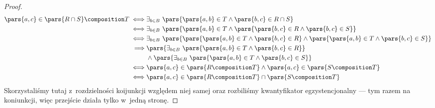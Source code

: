 \begin{description}
\begin{itemize}
                \begin{proof}
                    \begin{equation*}
                        \begin{split}
                            \pars{a, c} \in \pars{R \cap S} \composition T
                                \iff& \exists_{b \in B} \ \pars{\pars{a, b} \in T \land \pars{b, c} \in R \cap S}\\
                                \iff& \exists_{b \in B} \ \pars{\pars{a, b} \in T \land \pars{\pars{b, c} \in R \land \pars{b, c} \in S}}\\
                                \iff& \exists_{b \in B} \ \pars{\pars{\pars{a, b} \in T \land \pars{b, c} \in R} \land \pars{\pars{a, b} \in T \land \pars{b, c} \in S}}\\
                                \implies& \pars{\exists_{b \in B} \ \pars{\pars{a, b} \in T \land \pars{b, c} \in R}}\\
                                    &\land \pars{\exists_{b \in B} \ \pars{\pars{a, b} \in T \land \pars{b, c} \in S}}\\
                                \iff& \pars{a, c} \in \pars{R \composition T} \land \pars{a, c} \in \pars{S \composition T}\\
                                \iff& \pars{a, c} \in \pars{R \composition T} \cap \pars{S \composition T}
                        \end{split}
                    \end{equation*}
                    Skorzystaliśmy tutaj z~rozdzielności koijunkcji względem niej samej oraz rozbiliśmy kwantyfikator egzystencjonalny --- tym razem na koniunkcji, więc przejście działa tylko w~jedną stronę.
                \end{proof}
        \end{itemize}
\end{description}

